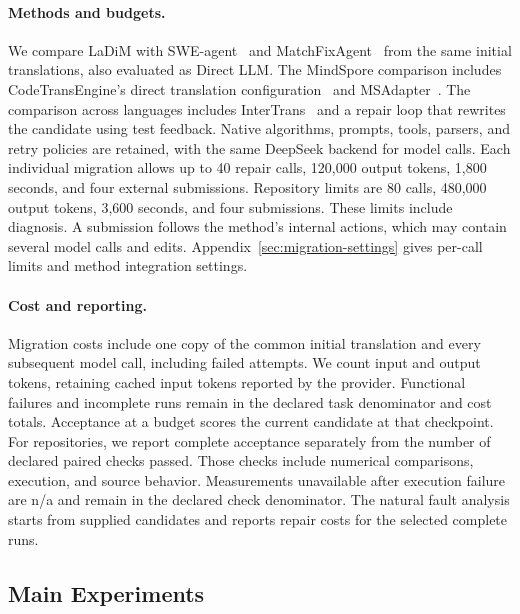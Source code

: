 \paragraph{Methods and budgets.}
We compare LaDiM with SWE-agent~\citep{yang2024sweagent} and MatchFixAgent~\citep{ibrahimzada2025matchfixagent} from the same initial translations, also evaluated as Direct LLM. The MindSpore comparison includes CodeTransEngine's direct translation configuration~\citep{macedo2025codetransengine} and MSAdapter~\citep{openi2025msadapter}. The comparison across languages includes InterTrans~\citep{macedo2024intertrans} and a repair loop that rewrites the candidate using test feedback. Native algorithms, prompts, tools, parsers, and retry policies are retained, with the same DeepSeek backend for model calls. Each individual migration allows up to 40 repair calls, 120,000 output tokens, 1,800 seconds, and four external submissions. Repository limits are 80 calls, 480,000 output tokens, 3,600 seconds, and four submissions. These limits include diagnosis. A submission follows the method's internal actions, which may contain several model calls and edits. Appendix~\ref{sec:migration-settings} gives per-call limits and method integration settings.

\paragraph{Cost and reporting.}
Migration costs include one copy of the common initial translation and every subsequent model call, including failed attempts. We count input and output tokens, retaining cached input tokens reported by the provider. Functional failures and incomplete runs remain in the declared task denominator and cost totals. Acceptance at a budget scores the current candidate at that checkpoint. For repositories, we report complete acceptance separately from the number of declared paired checks passed. Those checks include numerical comparisons, execution, and source behavior. Measurements unavailable after execution failure are n/a and remain in the declared check denominator. The natural fault analysis starts from supplied candidates and reports repair costs for the selected complete runs.

\subsection{Main Experiments}
\label{sec:main-results}

\begin{table}[t]
\caption{Migration results and model use on common inputs. Panels (a) and (b) report accepted programs and complete token costs. Panels (c) and (d) report checks passed and repository costs. Time series checks cover three seeds. Recommendation checks use the public seed.}
\label{tab:main-results}
\centering
\small
\setlength{\tabcolsep}{5pt}

\end{table}

